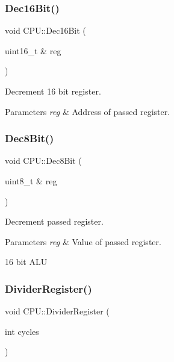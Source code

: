 \subsubsection{\texorpdfstring{Dec16\+Bit()}{Dec16Bit()}}
{\footnotesize\ttfamily void C\+P\+U\+::\+Dec16\+Bit (\begin{DoxyParamCaption}\item[{uint16\+\_\+t \&}]{reg }\end{DoxyParamCaption})\hspace{0.3cm}{\ttfamily [private]}}



Decrement 16 bit register. 


\begin{DoxyParams}{Parameters}
{\em reg} & Address of passed register. \\
\hline
\end{DoxyParams}
\mbox{\label{classCPU_a3cf31a897f91141ae26ee1b1b5cb86d7}} 
\subsubsection{\texorpdfstring{Dec8\+Bit()}{Dec8Bit()}}
{\footnotesize\ttfamily void C\+P\+U\+::\+Dec8\+Bit (\begin{DoxyParamCaption}\item[{uint8\+\_\+t \&}]{reg }\end{DoxyParamCaption})\hspace{0.3cm}{\ttfamily [private]}}



Decrement passed register. 


\begin{DoxyParams}{Parameters}
{\em reg} & Value of passed register.\\
\hline
\end{DoxyParams}
16 bit A\+LU \mbox{\label{classCPU_ae6c57423f6edcd249286c73e8e620bb9}} 
\subsubsection{\texorpdfstring{Divider\+Register()}{DividerRegister()}}
{\footnotesize\ttfamily void C\+P\+U\+::\+Divider\+Register (\begin{DoxyParamCaption}\item[{int}]{cycles }\end{DoxyParamCaption})}



